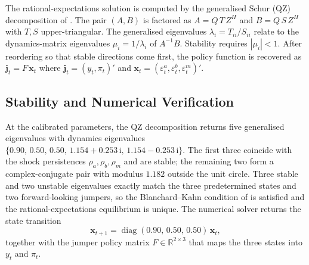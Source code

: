 The rational-expectations solution is computed by the generalised
Schur (QZ) decomposition of \citet{Klein2000}. The pair $(A,B)$ is
factored as $A=Q\,T\,Z^{H}$ and $B=Q\,S\,Z^{H}$ with $T,S$
upper-triangular. The generalised eigenvalues
$\lambda_{i}=T_{ii}/S_{ii}$ relate to the dynamics-matrix eigenvalues
$\mu_{i}=1/\lambda_{i}$ of $A^{-1}B$. Stability requires
$|\mu_{i}|<1$. After reordering so that stable directions come first,
the policy function is recovered as $\mathbf{j}_{t}=F\,\mathbf{x}_{t}$
where $\mathbf{j}_{t}=(y_{t},\pi_{t})'$ and
$\mathbf{x}_{t}=(\varepsilon_{t}^{a},\varepsilon_{t}^{b},
\varepsilon_{t}^{m})'$.

\subsection{Stability and Numerical Verification}
\label{sec:solution_stability}

At the calibrated parameters, the QZ decomposition returns five
generalised eigenvalues with dynamics eigenvalues
$\{0.90,\,0.50,\,0.50,\,1.154+0.253\,\mathrm{i},\,1.154-0.253\,\mathrm{i}\}$.
The first three coincide with the shock persistences
$\rho_{a},\rho_{b},\rho_{m}$ and are stable; the remaining two form a
complex-conjugate pair with modulus $1.182$ outside the unit circle.
Three stable and two unstable eigenvalues exactly match the three
predetermined states and two forward-looking jumpers, so the
Blanchard--Kahn condition of \citet{BlanchardKahn1980} is satisfied
and the rational-expectations equilibrium is unique. The numerical
solver returns the state transition
\begin{equation}
  \mathbf{x}_{t+1}=\operatorname{diag}(0.90,\,0.50,\,0.50)\,\mathbf{x}_{t},
  \label{eq:state-trans}
\end{equation}
together with the jumper policy matrix
$F\in\mathbb{R}^{2\times 3}$ that maps the three states into $y_{t}$
and $\pi_{t}$.
